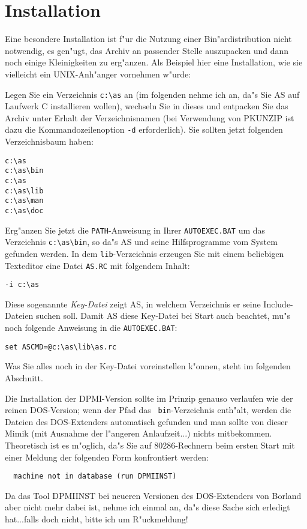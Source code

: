 \documentclass[12pt,a4paper,twoside]{report}
\newcommand{\tty}[1]{{\tt #1}}
\begin{document}

\section{Installation}

Eine besondere  Installation ist f"ur die Nutzung
einer Bin"ardistribution nicht notwendig, es gen"ugt, das Archiv an
passender Stelle auszupacken und dann noch einige Kleinigkeiten zu
erg"anzen.  Als Beispiel hier eine Installation, wie sie vielleicht
ein UNIX-Anh"anger vornehmen w"urde:

Legen Sie ein Verzeichnis \verb!c:\as! an (im folgenden nehme ich an,
da"s Sie AS auf Laufwerk C installieren wollen), wechseln Sie in dieses
und entpacken Sie das Archiv unter Erhalt der Verzeichnisnamen (bei
Verwendung von PKUNZIP ist dazu die Kommandozeilenoption \verb!-d!
erforderlich).  Sie sollten jetzt folgenden Verzeichnisbaum haben:
\begin{verbatim}
c:\as
c:\as\bin
c:\as
c:\as\lib
c:\as\man
c:\as\doc
\end{verbatim}
Erg"anzen Sie jetzt die \tty{PATH}-Anweisung in Ihrer \tty{AUTOEXEC.BAT}
um das Verzeichnis \verb!c:\as\bin!, so da"s AS und seine Hilfsprogramme
vom System gefunden werden.  In dem \tty{lib}-Verzeichnis erzeugen Sie
mit einem beliebigen Texteditor eine Datei \tty{AS.RC} mit folgendem
Inhalt:
\begin{verbatim}
-i c:\as
\end{verbatim}
Diese sogenannte {\em Key-Datei} zeigt AS, in welchem Verzeichnis er seine
Include-Dateien suchen soll.  Damit AS diese Key-Datei bei Start
auch beachtet, mu"s noch folgende Anweisung in die \tty{AUTOEXEC.BAT}:
\begin{verbatim}
set ASCMD=@c:\as\lib\as.rc
\end{verbatim}
Was Sie alles noch in der Key-Datei voreinstellen k"onnen, steht im
folgenden Abschnitt.

Die Installation der DPMI-Version  sollte im Prinzip
genauso verlaufen wie der reinen DOS-Version; wenn der Pfad das {\tt
bin}-Verzeichnis enth"alt, werden die Dateien des DOS-Extenders
automatisch gefunden und man sollte von dieser Mimik (mit Ausnahme der
l"angeren Anlaufzeit...) nichts mitbekommen.  Theoretisch ist es m"oglich,
da"s Sie auf 80286-Rechnern beim ersten Start mit einer Meldung der
folgenden Form konfrontiert werden:
\begin{verbatim}
  machine not in database (run DPMIINST)
\end{verbatim}
Da das Tool DPMIINST bei neueren Versionen des DOS-Extenders von Borland
aber nicht mehr dabei ist, nehme ich einmal an, da"s diese Sache sich
erledigt hat...falls doch nicht, bitte ich um R"uckmeldung!
\end{document}
